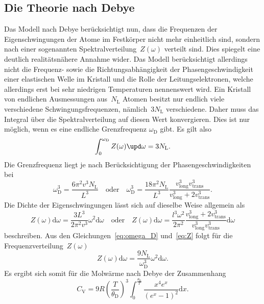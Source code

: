 \subsection{Die Theorie nach Debye}
%
Das Modell nach Debye berücksichtigt nun, dass die Frequenzen der
Eigenschwingungen der Atome im Festkörper nicht mehr einheitlich sind, sondern
nach einer sogenannten Spektralverteilung~$Z(\omega)$ verteilt sind. Dies
spiegelt eine deutlich realitätsnähere Annahme wider. Das Modell berücksichtigt
allerdings nicht die Frequenz- sowie die Richtungsabhängigkeit der
Phasengeschwindigkeit einer elastischen Welle im Kristall und die Rolle der
Leitungselektronen, welche allerdings erst bei sehr niedrigen Temperaturen
nennenswert wird. Ein Kristall von endlichen Ausmessungen aus~$N_{\mathrm{L}}$
Atomen besitzt nur endlich viele verschiedene Schwingungsfrequenzen,
nämlich~$3N_{\mathrm{L}}$ verschiedene. Daher muss das Integral über die
Spektralverteilung auf diesen Wert konvergieren. Dies ist nur möglich, wenn es
eine endliche Grenzfrequenz $\omega_{\mathrm{D}}$ gibt. Es gilt also
%
\begin{equation}
  \int_0^{\omega_{\mathrm{D}}}Z(\omega)\upd\omega=3N_{\mathrm{L}}.
  \label{eq:konv}
\end{equation}
%
Die Grenzfrequenz liegt je nach Berücksichtigung der Phasengeschwindigkeiten bei
%
\begin{equation}
  \omega_{\mathrm{D}}^3=\frac{6\pi^2v^3N_{\mathrm{L}}}{L^3}\quad\text{oder}\quad\omega_{\mathrm{D}}^3=\frac{18\pi^2N_{\mathrm{L}}}{L^3}\frac{v_{\mathrm{long}}^3v_{\mathrm{trans}}^3}{v_{\mathrm{long}}^3+2v_{\mathrm{trans}}^3}.
  \label{eq:omega_D}
\end{equation}
%
Die Dichte der Eigenschwingungen lässt sich auf dieselbe Weise allgemein als
%
\begin{equation}
  Z(\omega)\mathup{d}\omega=\frac{3L^3}{2\pi^2v^3}\omega^2\mathup{d}\omega\quad\text{oder}\quad Z(\omega)\mathup{d}\omega=\frac{l^3\omega^2}{2\pi^2}\frac{v_{\mathrm{long}}^3+2v_{\mathrm{trans}}^3}{v_{\mathrm{long}}^3v_{\mathrm{trans}}^3}\mathup{d}\omega
  \label{eq:Z}
\end{equation}
%
beschreiben. Aus den Gleichungen~\eqref{eq:omega_D} und~\eqref{eq:Z} folgt für
die Frequenzverteilung~$Z(\omega)$
%
\begin{equation}
  Z(\omega)\mathup{d}\omega=\frac{9N_{\mathrm{L}}}{\omega_{\mathrm{D}}^3}\omega^2\mathup{d}\omega.
\end{equation}
%
Es ergibt sich somit für die Molwärme nach Debye der Zusammenhang
%
\begin{equation}
  C_{\mathrm{V}}=9R\left(\frac{T}{\theta_{\mathrm{D}}}\right)^3\int_0^{\frac{\theta_{\mathrm{D}}}{T}}\frac{x^4e^x}{(e^x-1)^2}\mathup{d}x.
  \label{eq:debyetemperatur}
\end{equation}

